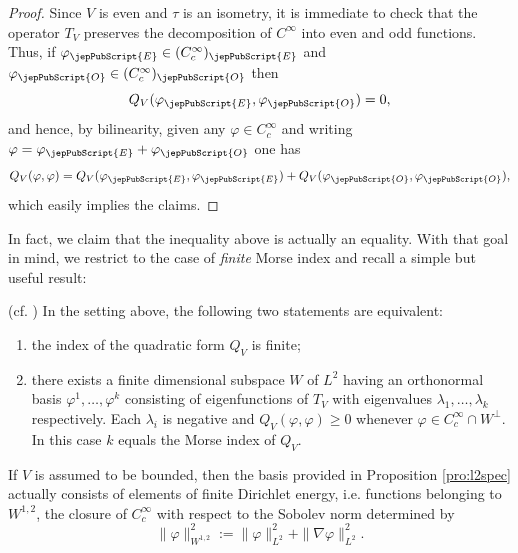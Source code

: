         	\begin{proof} Since $V$ is even and $\tau$ is an isometry, it is immediate to check that the operator $T_V$ preserves the decomposition of $C^{\infty}$ into even and odd functions. Thus, if $\varphi_{{\jepPubScript{E}}}\in (C^{\infty}_c)_{{\jepPubScript{E}}}$ and $\varphi_{{\jepPubScript{O}}}\in (C^{\infty}_c)_{{\jepPubScript{O}}}$ then
        		\begin{equation}\label{eq:mixedprod}
        		Q_{V}(\varphi_{{\jepPubScript{E}}},\varphi_{{\jepPubScript{O}}})=0,
        		\end{equation}
        		and hence, by bilinearity, given any $\varphi\in C^{\infty}_c$ and writing $\varphi=\varphi_{{\jepPubScript{E}}}+\varphi_{{\jepPubScript{O}}}$ one has
        		\[
        		Q_{V}(\varphi,\varphi)=Q_{V}(\varphi_{{\jepPubScript{E}}},\varphi_{{\jepPubScript{E}}})+Q_{V}(\varphi_{{\jepPubScript{O}}},\varphi_{{\jepPubScript{O}}}),
        		\]
        		which easily implies the claims.
        	\end{proof}		
        	
        	
        	
        	In fact, we claim that the inequality above is actually an equality. 
        	With that goal in mind, we restrict to the case of \textsl{finite} Morse index and recall a simple but useful result:
        	
        	\begin{prop}\label{pro:l2spec}(cf. \cite[Prop.~2]{FC85})
        		In the setting above, the following two statements are equivalent:
        		\begin{enumerate}
        			\item{the index of the quadratic form $Q_V$ is finite;}
        			\item{there exists a finite dimensional subspace $W$ of $L^2$ having an orthonormal basis $\varphi^1,\ldots,\varphi^k$ consisting of eigenfunctions of $T_V$ with eigenvalues $\lambda_1,\ldots,\lambda_k$ respectively. Each $\lambda_i$ is negative and $Q_V(\varphi,\varphi)\geqslant 0$ whenever $\varphi\in C^{\infty}_c\cap W^{\perp}$. In this case $k$ equals the Morse index of $Q_V$.}	
        		\end{enumerate}		
        	\end{prop}
        	
        	
        	\begin{rmk}\label{rmk:Vbounded} If $V$ is assumed to be bounded, then the basis provided in Proposition \ref{pro:l2spec} actually consists of elements of finite Dirichlet energy, i.e. functions belonging to $W^{1,2}$, the closure of $C^{\infty}_c$ with respect to the Sobolev norm determined by
        		\begin{equation}\label{eq:SobNorm}
        		\|\varphi\|^2_{W^{1,2}}:= \|\varphi\|^2_{L^2}+\|\nabla \varphi\|^2_{L^2}.
        		\end{equation}	
        	\end{rmk}	
        	
